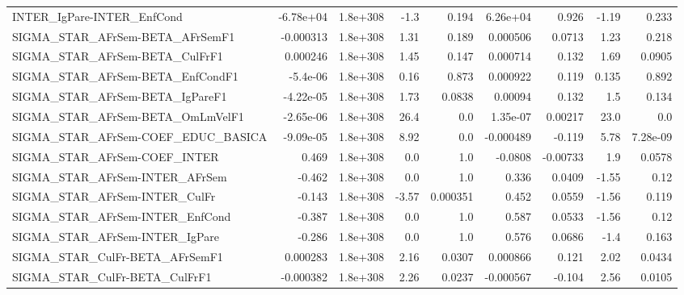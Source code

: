 \begin{tabular}{lrrrrrrrr}
INTER\_IgPare-INTER\_EnfCond            &   -6.78e+04 &     1.8e+308 &    -1.3 &    0.194 &   6.26e+04 &       0.926 &        -1.19 &         0.233 \\
SIGMA\_STAR\_AFrSem-BETA\_AFrSemF1       &   -0.000313 &     1.8e+308 &    1.31 &    0.189 &   0.000506 &      0.0713 &         1.23 &         0.218 \\
SIGMA\_STAR\_AFrSem-BETA\_CulFrF1        &    0.000246 &     1.8e+308 &    1.45 &    0.147 &   0.000714 &       0.132 &         1.69 &        0.0905 \\
SIGMA\_STAR\_AFrSem-BETA\_EnfCondF1      &    -5.4e-06 &     1.8e+308 &    0.16 &    0.873 &   0.000922 &       0.119 &        0.135 &         0.892 \\
SIGMA\_STAR\_AFrSem-BETA\_IgPareF1       &   -4.22e-05 &     1.8e+308 &    1.73 &   0.0838 &    0.00094 &       0.132 &          1.5 &         0.134 \\
SIGMA\_STAR\_AFrSem-BETA\_OmLmVelF1      &   -2.65e-06 &     1.8e+308 &    26.4 &      0.0 &   1.35e-07 &     0.00217 &         23.0 &           0.0 \\
SIGMA\_STAR\_AFrSem-COEF\_EDUC\_BASICA    &   -9.09e-05 &     1.8e+308 &    8.92 &      0.0 &  -0.000489 &      -0.119 &         5.78 &      7.28e-09 \\
SIGMA\_STAR\_AFrSem-COEF\_INTER          &       0.469 &     1.8e+308 &     0.0 &      1.0 &    -0.0808 &    -0.00733 &          1.9 &        0.0578 \\
SIGMA\_STAR\_AFrSem-INTER\_AFrSem        &      -0.462 &     1.8e+308 &     0.0 &      1.0 &      0.336 &      0.0409 &        -1.55 &          0.12 \\
SIGMA\_STAR\_AFrSem-INTER\_CulFr         &      -0.143 &     1.8e+308 &   -3.57 & 0.000351 &      0.452 &      0.0559 &        -1.56 &         0.119 \\
SIGMA\_STAR\_AFrSem-INTER\_EnfCond       &      -0.387 &     1.8e+308 &     0.0 &      1.0 &      0.587 &      0.0533 &        -1.56 &          0.12 \\
SIGMA\_STAR\_AFrSem-INTER\_IgPare        &      -0.286 &     1.8e+308 &     0.0 &      1.0 &      0.576 &      0.0686 &         -1.4 &         0.163 \\
SIGMA\_STAR\_CulFr-BETA\_AFrSemF1        &    0.000283 &     1.8e+308 &    2.16 &   0.0307 &   0.000866 &       0.121 &         2.02 &        0.0434 \\
SIGMA\_STAR\_CulFr-BETA\_CulFrF1         &   -0.000382 &     1.8e+308 &    2.26 &   0.0237 &  -0.000567 &      -0.104 &         2.56 &        0.0105 \\

\end{tabular}
